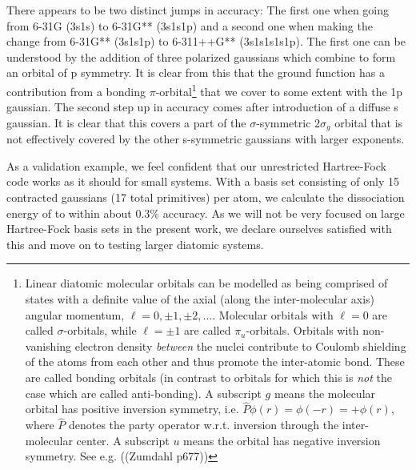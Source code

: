 \documentclass[a4paper]{article}
\begin{document}
There appears to be two distinct jumps in accuracy: The first one when going from 6-31G (3s1s) to 6-31G** (3s1s1p) and a second one when making the change from 6-31G** (3s1s1p) to 6-311++G** (3s1s1s1s1p). The first one can be understood by the addition of three polarized gaussians which combine to form an orbital of p symmetry. It is clear from this that the  ground function has a contribution from a bonding $\pi$-orbital\footnote{Linear diatomic molecular orbitals can be modelled as being comprised of states with a definite value of the axial (along the inter-molecular axis) angular momentum, $\ell=0,\pm1,\pm2,\dots$. Molecular orbitals with $\ell=0$ are called $\sigma$-orbitals, while $\ell=\pm1$ are called $\pi_u$-orbitals. Orbitals with non-vanishing electron density \emph{between} the nuclei contribute to Coulomb shielding of the atoms from each other and thus promote the inter-atomic bond. These are called bonding orbitals (in contrast to orbitals for which this is \emph{not} the case which are called anti-bonding). A subscript $g$ means the molecular orbital has positive inversion symmetry, i.e. $\hat P \phi(r)=\phi(-r) = +\phi(r)$, where $\hat P$ denotes the party operator w.r.t. inversion through the inter-molecular center. A subscript $u$ means the orbital has negative inversion symmetry. See e.g. ((Zumdahl p677))} that we cover to some extent with the 1p gaussian. The second step up in accuracy comes after introduction of a diffuse s gaussian. It is clear that this covers a part of the $\sigma$-symmetric $2\sigma_g$ orbital that is not effectively covered by the other s-symmetric gaussians with larger exponents. 

As a validation example, we feel confident that our unrestricted Hartree-Fock code works as it should for small systems. With a basis set consisting of only 15 contracted gaussians (17 total primitives) per atom, we calculate the dissociation energy of  to within about $0.3\%$ accuracy. As we will not be very focused on large Hartree-Fock basis sets in the present work, we declare ourselves satisfied with this and move on to testing larger diatomic systems.
\end{document}

